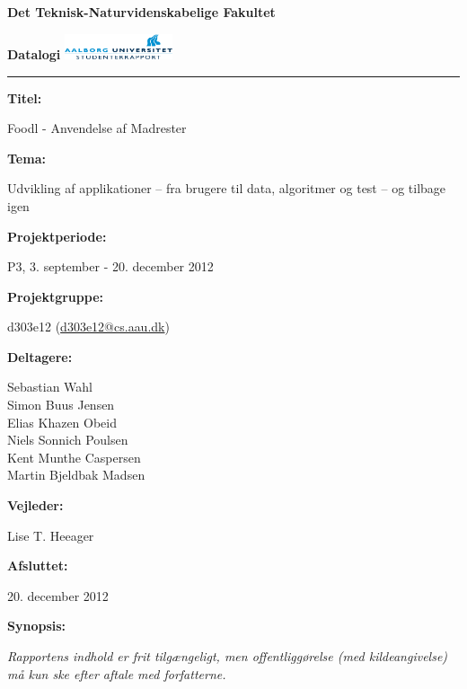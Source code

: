 \begin{nopagebreak}
\LARGE{\textbf{Det Teknisk-Naturvidenskabelige Fakultet}}\vspace{-0.9cm}

\large{\textbf{Datalogi}}
\hspace{10.5cm}\includegraphics[height=0.75cm]{billeder/aau_logo.pdf}


\hrule

\newcommand{\titleitem}[2]{\textbf{#1:}

\hspace*{0.5cm}
\begin{minipage}{0.9\columnwidth}#2\end{minipage}
\vspace{0.25cm}}
\begin{multicols}{2}

\titleitem{Titel}{Foodl - Anvendelse af Madrester}

\titleitem{Tema}{Udvikling af applikationer – fra brugere til data, algoritmer og test – og tilbage igen}

\titleitem{Projektperiode}{P3, 3. september - 20. december 2012}
\label{tidsperiode}

\titleitem{Projektgruppe}{d303e12 (\url{d303e12@cs.aau.dk})}

\titleitem{Deltagere}{
    Sebastian Wahl\\
    Simon Buus Jensen\\
    Elias Khazen Obeid\\
    Niels Sonnich Poulsen\\
    Kent Munthe Caspersen\\
    Martin Bjeldbak Madsen
}

\titleitem{Vejleder}{Lise T. Heeager}

\titleitem{Afsluttet}{20. december 2012}

\vfill
\columnbreak

\titleitem{Synopsis}{  }

\end{multicols}
\centering
\textit{Rapportens indhold er frit tilgængeligt, men offentliggørelse (med kildeangivelse) må kun ske efter aftale med
forfatterne.}

\end{nopagebreak}
